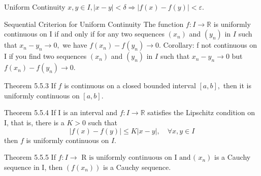 \documentclass[10pt,landscape]{article}
\theoremstyle{definition}
\newcommand{\thistheoremname}{}
\newtheorem*{genericthm*}{\thistheoremname}
\newenvironment{namedthm*}[1]
{\renewcommand{\thistheoremname}{#1}\begin{genericthm*}}
{\end{genericthm*}}
\begin{document}
\begin{multicols}{3}
	\begin{namedthm*}{Uniform Continuity}
		\(x, y \in I,|x-y|<\delta \Longrightarrow|f(x)-f(y)|<\varepsilon\).
	\end{namedthm*}

	\begin{namedthm*}{Sequential Criterion for Uniform Continuity}
		The function \(f: I \rightarrow \mathbb{R}\) is uniformly continuous on I if and only if for any two sequences \(\left(x_{n}\right)\) and \(\left(y_{n}\right)\)
		in \(I\) such that \(x_{n}-y_{n} \rightarrow 0,\) we have \(f\left(x_{n}\right)-f\left(y_{n}\right) \rightarrow 0\). Corollary: f not continuous on I if you find two sequences \(\left(x_{n}\right)\) and \(\left(y_{n}\right)\) in \(I\) such that \(x_{n}-y_{n} \rightarrow 0\) but \(f\left(x_{n}\right)-f\left(y_{n}\right) \rightarrow 0\).
	\end{namedthm*}

	\begin{namedthm*}{Theorem 5.5.3}
		If \(f\) is continuous on a closed bounded interval \([a, b],\) then it is uniformly continuous
		on \([a, b] .\)
	\end{namedthm*}

	\begin{namedthm*}{Theorem 5.5.4}
		If I is an interval and \(f: I \rightarrow \mathbb{R}\) satisfies the Lipschitz condition on I, that is, there
		is a \(K>0\) such that
		\[
			|f(x)-f(y)| \leq K|x-y|, \quad \forall x, y \in I
		\]
		then \(f\) is uniformly continuous on \(I .\)
	\end{namedthm*}

	\begin{namedthm*}{Theorem 5.5.5}
		If \(\left.f: I \rightarrow \text { R is uniformly continuous on I and ( } x_{n}\right)\) is a Cauchy sequence in I, then
		\(\left(f\left(x_{n}\right)\right)\) is a Cauchy sequence.
	\end{namedthm*}


\end{multicols}
\end{document}

